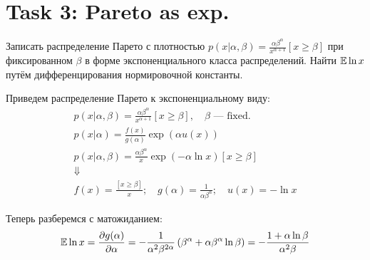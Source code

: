 
\section{Task 3: Pareto as exp.}

\begin{task}
    Записать распределение Парето с плотностью $p(x|\alpha, \beta) = \frac{\alpha \beta^{\alpha}}{x^{\alpha + 1}}[x \ge \beta]$ при фиксированном $\beta$ в форме экспоненциального класса распределений. Найти $\mathbb{E} \ln x$ путём дифференцирования нормировочной константы.
\end{task}

\begin{solution}

    Приведем распределение Парето к экспоненциальному виду:
    \begin{gather}
        p(x|\alpha, \beta) = \frac{\alpha \beta^{\alpha}}{x^{\alpha + 1}}[x \ge \beta], \quad \beta \text{ --- fixed.} \\
        p(x | \alpha) = \frac{f(x)}{g(\alpha)}\exp(\alpha u(x)) \\
        p(x | \alpha, \beta) = \frac{\alpha \beta^{\alpha}}{x} \exp(-\alpha \ln x)[x \ge \beta] \\
        \Downarrow \\
        f(x) = \frac{[x \ge \beta]}{x}; \quad g(\alpha) = \frac{1}{\alpha \beta^{\alpha}}; \quad u(x) = -\ln x
    \end{gather}

    Теперь разберемся с матожиданием:
    \begin{gather}
        \mathbb{E} \ln x = \frac{\partial g(\alpha)}{\partial \alpha} = -\frac{1}{\alpha^2 \beta^{2 \alpha}}\left( \beta^{\alpha} + \alpha \beta^{\alpha} \ln \beta \right) = - \frac{1 + \alpha \ln \beta}{\alpha^2 \beta}
    \end{gather}
\end{solution}
